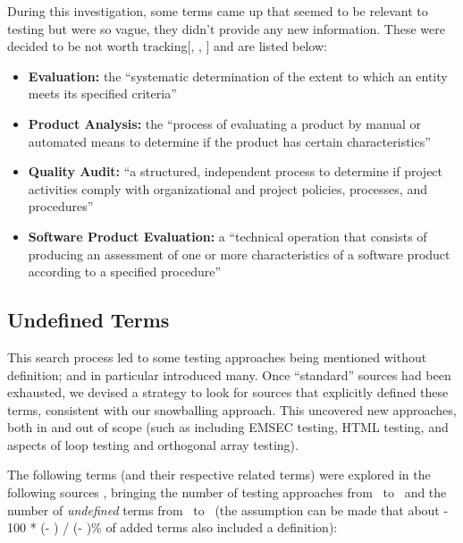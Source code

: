 \ifnotpaper
      During this investigation, some terms came up that seemed to be relevant to
      testing but were so vague, they didn't provide any new information. These were
      decided to be not worth tracking[, ,
            ] and are listed below:

      \begin{itemize}
            \item \textbf{Evaluation:} the ``systematic determination of the extent
                  to which an entity meets its specified criteria''
                  \citep[p.~167]{IEEE2017}
            \item \textbf{Product Analysis:} the ``process of evaluating a product by
                  manual or automated means to determine if the product has certain
                  characteristics'' \citep[p.~343]{IEEE2017}
            \item \textbf{Quality Audit:} ``a structured, independent process to
                  determine if project activities comply with organizational and
                  project policies, processes, and procedures'' \citep[p.~361]{IEEE2017}
            \item \textbf{Software Product Evaluation:} a ``technical operation that
                  consists of producing an assessment of one or more characteristics
                  of a software product according to a specified procedure''
                  \citep[p.~424]{IEEE2017}
      \end{itemize}
\fi

\subsection{Undefined Terms}
\label{undef-terms}


\newcount\TotalBefore
\newcount\TotalAfter
\newcount\UndefBefore
\newcount\UndefAfter



This search process led to some testing approaches being
mentioned without definition;
\citep{IEEE2022} and \citep{Firesmith2015} in particular introduced many.
Once ``standard'' sources had been exhausted, we devised a strategy to
look for sources that explicitly defined these terms, consistent with
our snowballing approach. This uncovered new approaches, both in and out of
scope (such as
including EMSEC testing, HTML testing, and aspects of loop testing and
orthogonal array testing).

The following terms (and their respective related terms)
were explored%
\ifnotpaper
      { in the following sources}%
\fi, bringing the number of testing
approaches from \the\TotalBefore~to \the\TotalAfter~and the number of
\emph{undefined} terms from \the\UndefBefore~to \the\UndefAfter~(the assumption
can be made that about \the{} - 100 * (\UndefAfter - \UndefBefore) /
(\TotalAfter - \TotalBefore)\relax\% of added terms also included a definition):


